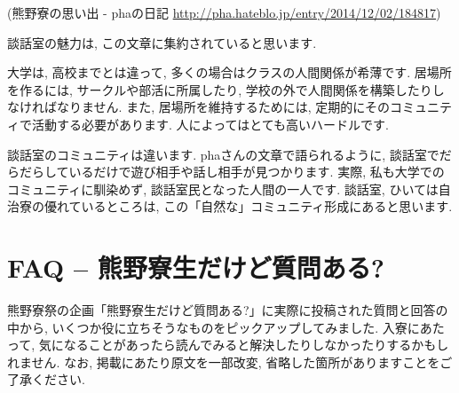 \documentclass[10pt,b5jsbook,dvips,dvipdfmx,openany]{jsbook}
\theoremstyle{definition}
\begin{document}
		(熊野寮の思い出 - phaの日記 \url{http://pha.hateblo.jp/entry/2014/12/02/184817})

		談話室の魅力は, この文章に集約されていると思います.

		大学は, 高校までとは違って, 多くの場合はクラスの人間関係が希薄です. 居場所を作るには, サークルや部活に所属したり, 学校の外で人間関係を構築したりしなければなりません. また, 居場所を維持するためには, 定期的にそのコミュニティで活動する必要があります. 人によってはとても高いハードルです.

		談話室のコミュニティは違います. phaさんの文章で語られるように, 談話室でだらだらしているだけで遊び相手や話し相手が見つかります. 実際, 私も大学でのコミュニティに馴染めず, 談話室民となった人間の一人です. 談話室, ひいては自治寮の優れているところは, この「自然な」コミュニティ形成にあると思います.



\chapter{FAQ -- 熊野寮生だけど質問ある?}
熊野寮祭の企画「熊野寮生だけど質問ある?」に実際に投稿された質問と回答の中から, いくつか役に立ちそうなものをピックアップしてみました. 入寮にあたって, 気になることがあったら読んでみると解決したりしなかったりするかもしれません. なお, 掲載にあたり原文を一部改変, 省略した箇所がありますことをご了承ください.
\end{document}
